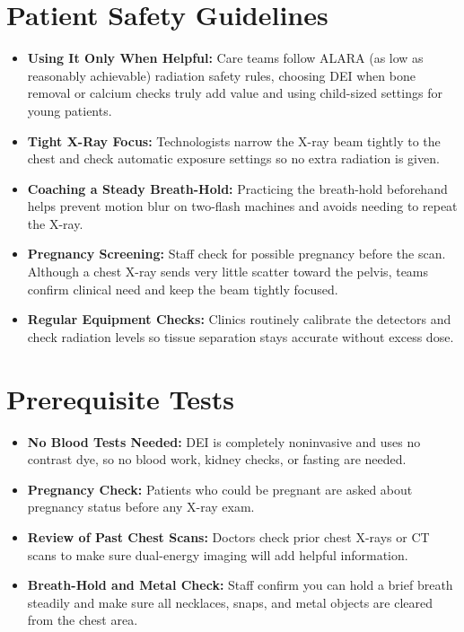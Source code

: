 \section{Patient Safety Guidelines}
\begin{itemize}
    \item \textbf{Using It Only When Helpful:} Care teams follow ALARA (as low as reasonably achievable) radiation safety rules, choosing DEI when bone removal or calcium checks truly add value and using child-sized settings for young patients.
    \item \textbf{Tight X-Ray Focus:} Technologists narrow the X-ray beam tightly to the chest and check automatic exposure settings so no extra radiation is given.
    \item \textbf{Coaching a Steady Breath-Hold:} Practicing the breath-hold beforehand helps prevent motion blur on two-flash machines and avoids needing to repeat the X-ray.
    \item \textbf{Pregnancy Screening:} Staff check for possible pregnancy before the scan. Although a chest X-ray sends very little scatter toward the pelvis, teams confirm clinical need and keep the beam tightly focused.
    \item \textbf{Regular Equipment Checks:} Clinics routinely calibrate the detectors and check radiation levels so tissue separation stays accurate without excess dose.
\end{itemize}

\section{Prerequisite Tests}
\begin{itemize}
    \item \textbf{No Blood Tests Needed:} DEI is completely noninvasive and uses no contrast dye, so no blood work, kidney checks, or fasting are needed.
    \item \textbf{Pregnancy Check:} Patients who could be pregnant are asked about pregnancy status before any X-ray exam.
    \item \textbf{Review of Past Chest Scans:} Doctors check prior chest X-rays or CT scans to make sure dual-energy imaging will add helpful information.
    \item \textbf{Breath-Hold and Metal Check:} Staff confirm you can hold a brief breath steadily and make sure all necklaces, snaps, and metal objects are cleared from the chest area.
\end{itemize}

